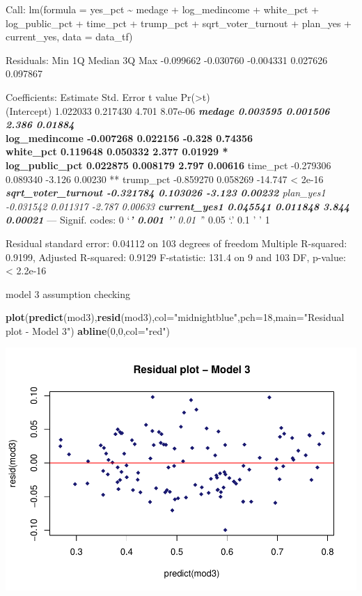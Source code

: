 \documentclass[
]{article}
\newenvironment{Shaded}{\begin{snugshade}}{\end{snugshade}}
\newcommand{\DataTypeTok}[1]{\textcolor[rgb]{0.13,0.29,0.53}{#1}}
\newcommand{\DecValTok}[1]{\textcolor[rgb]{0.00,0.00,0.81}{#1}}
\newcommand{\KeywordTok}[1]{\textcolor[rgb]{0.13,0.29,0.53}{\textbf{#1}}}
\newcommand{\NormalTok}[1]{#1}
\newcommand{\StringTok}[1]{\textcolor[rgb]{0.31,0.60,0.02}{#1}}
\begin{document}
Call: lm(formula = yes\_pct \textasciitilde{} medage + log\_medincome +
white\_pct + log\_public\_pct + time\_pct + trump\_pct +
sqrt\_voter\_turnout + plan\_yes + current\_yes, data = data\_tf)

Residuals: Min 1Q Median 3Q Max -0.099662 -0.030760 -0.004331 0.027626
0.097867

Coefficients: Estimate Std. Error t value
Pr(\textgreater\textbar t\textbar)\\
(Intercept) 1.022033 0.217430 4.701 8.07e-06 \textbf{\emph{ medage
0.003595 0.001506 2.386 0.01884 }\\
log\_medincome -0.007268 0.022156 -0.328 0.74356\\
white\_pct 0.119648 0.050332 2.377 0.01929 *\\
log\_public\_pct 0.022875 0.008179 2.797 0.00616 } time\_pct -0.279306
0.089340 -3.126 0.00230 ** trump\_pct -0.859270 0.058269 -14.747
\textless{} 2e-16 \emph{\textbf{ sqrt\_voter\_turnout -0.321784 0.103026
-3.123 0.00232 } plan\_yes1 -0.031542 0.011317 -2.787 0.00633 \textbf{
current\_yes1 0.045541 0.011848 3.844 0.00021 }} --- Signif. codes: 0
`\emph{\textbf{' 0.001 '}' 0.01 '}' 0.05 `.' 0.1 ' ' 1

Residual standard error: 0.04112 on 103 degrees of freedom Multiple
R-squared: 0.9199, Adjusted R-squared: 0.9129 F-statistic: 131.4 on 9
and 103 DF, p-value: \textless{} 2.2e-16

model 3 assumption checking

\begin{Shaded}
\begin{Highlighting}[]
\KeywordTok{plot}\NormalTok{(}\KeywordTok{predict}\NormalTok{(mod3),}\KeywordTok{resid}\NormalTok{(mod3),}\DataTypeTok{col=}\StringTok{"midnightblue"}\NormalTok{,}\DataTypeTok{pch=}\DecValTok{18}\NormalTok{,}\DataTypeTok{main=}\StringTok{"Residual plot - Model 3"}\NormalTok{)}
\KeywordTok{abline}\NormalTok{(}\DecValTok{0}\NormalTok{,}\DecValTok{0}\NormalTok{,}\DataTypeTok{col=}\StringTok{"red"}\NormalTok{)}
\end{Highlighting}
\end{Shaded}

\includegraphics{Zhong_paper_files/figure-latex/unnamed-chunk-9-1.pdf}
\end{document}
